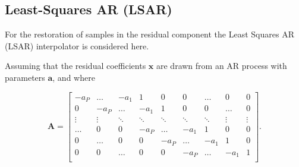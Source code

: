 %
%
%

\subsection{Least-Squares AR (LSAR)}\label{sec:ResidualRestorationLSAR}
For the restoration of samples in the residual component the Least Squares AR (LSAR) interpolator is considered here\cite{Godsill1998book}.

Assuming that the residual coefficients $\mathbf{x}$ are drawn from an AR process with parameters $\mathbf{a}$, and where

\begin{equation}\label{eq:LSAR0} \mathbf{A} =
\begin{bmatrix}
    -a_P    & \ldots & -a_1 & 1 & 0 & 0 & \ldots & 0 & 0 \\
    0       & -a_P & \ldots & -a_1 & 1 & 0 & 0 & \ldots & 0 \\
    \vdots  & \vdots    & \ddots & \ddots & \ddots & \ddots & \ddots & \vdots & \vdots \\
    \ldots  & 0 & 0 & -a_P    & \ldots & -a_1 & 1 & 0 & 0 \\
    0       & \ldots  & 0 & 0 & -a_P    & \ldots & -a_1 & 1 & 0 \\
    0       & 0 & \ldots  & 0 & 0 & -a_P    & \ldots & -a_1 & 1 \\
\end{bmatrix}.
\end{equation}

